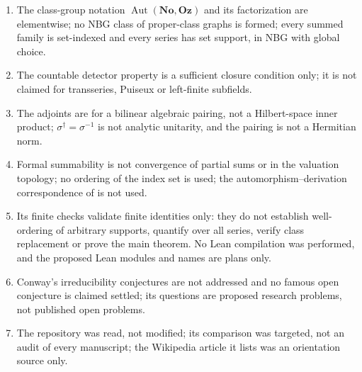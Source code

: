 \documentclass[11pt,oneside]{article}
\numberwithin{equation}{section}
\theoremstyle{definition}
\theoremstyle{remark}
\newcommand{\No}{\mathbf{No}}
\newcommand{\Oz}{\mathbf{Oz}}
\newcommand{\Aut}{\operatorname{Aut}}
\begin{document}
\begin{enumerate}[itemsep=1pt]
an externally quantified operation, not definability.
\item The class-group notation $\Aut(\No,\Oz)$ and its factorization are elementwise; no NBG class of
proper-class graphs is formed; every summed family is set-indexed and every series has set support,
in NBG with global choice.
\item The countable detector property is a sufficient closure condition only; it is not claimed for
transseries, Puiseux or left-finite subfields.
\item The adjoints are for a bilinear algebraic pairing, not a Hilbert-space inner product;
$\sigma^\dagger=\sigma^{-1}$ is not analytic unitarity, and the pairing is not a Hermitian norm.
\item Formal summability is not convergence of partial sums or in the valuation topology; no
ordering of the index set is used; the automorphism--derivation correspondence of \cite{BKKPS} is
not used.
\item Its finite checks validate finite identities only: they do not establish well-ordering of
arbitrary supports, quantify over all series, verify class replacement or prove the main theorem.
No Lean compilation was performed, and the proposed Lean modules and names are plans only.
\item Conway's irreducibility conjectures are not addressed and no famous open conjecture is
claimed settled; its questions are proposed research problems, not published open problems.
\item The repository was read, not modified; its comparison was targeted, not an audit of every
manuscript; the Wikipedia article it lists was an orientation source only.
\end{enumerate}
\end{document}
